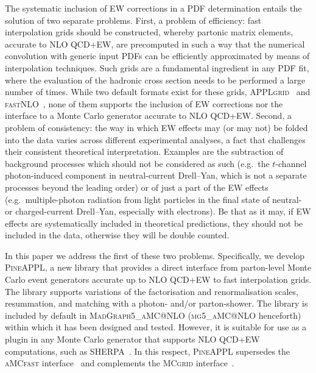 The systematic inclusion of EW corrections in a PDF determination entails
the solution of two separate problems. First, a problem of efficiency:
fast interpolation grids should be constructed, whereby partonic matrix 
elements, accurate to NLO QCD+EW, are precomputed in such a way that the 
numerical convolution with generic input PDFs can be efficiently approximated
by means of interpolation techniques. Such grids are a fundamental ingredient
in any PDF fit, where the evaluation of the hadronic cross section needs to 
be performed a large number of times. While two default formats exist for
these grids, \textsc{APPLgrid}~\cite{Carli:2010rw} and
\textsc{fastNLO}~\cite{Kluge:2006xs}, none of them supports the inclusion of EW
corrections nor the interface to a Monte Carlo generator accurate to 
NLO QCD+EW\@. Second, a problem of consistency: the way in which EW effects may
(or may not) be folded into the data varies across different experimental 
analyses, a fact that challenges their consistent theoretical interpretation. 
Examples are the subtraction of background processes which should not be 
considered as such (e.g.\ the $t$-channel photon-induced component in
neutral-current Drell--Yan, which is not a separate processes beyond the leading
order) or of just a part of the EW effects (e.g.\ multiple-photon
radiation from light particles in the final state of neutral- or charged-current
Drell--Yan, especially with electrons). Be that as it may, if EW effects are
systematically included in theoretical predictions, they should not be included 
in the data, otherwise they will be double counted.

In this paper we address the first of these two problems. Specifically, 
we develop \textsc{PineAPPL}, a new library that provides a direct interface
from parton-level Monte Carlo event generators accurate up to NLO QCD+EW to
fast interpolation grids. The library supports variations of the factorisation
and renormalisation scales, resummation, and matching with a photon- and/or
parton-shower. The library is included by default in 
\textsc{MadGraph5\_aMC@NLO} (\textsc{mg5\_aMC@NLO} henceforth) within which it has
been designed and tested. However, it is suitable for use as a plugin in any 
Monte Carlo generator that supports NLO QCD+EW computations, such as 
\textsc{SHERPA}~\cite{Biedermann:2017yoi}. In this respect, \textsc{PineAPPL}
supersedes the \textsc{aMCfast} interface~\cite{Bertone:2014zva} and complements
the \textsc{MCgrid} interface~\cite{DelDebbio:2013kxa,Bothmann:2015dba}.

